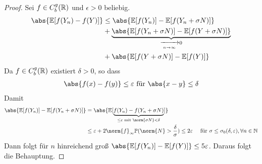 \begin{proof}
	Sei $f \in C_b^g(\mathbb{R})$ und $\epsilon > 0$ beliebig.
	\begin{align*}
		\abs{\E[f(Y_n)-f(Y)]} &\le \abs{\E[f(Y_n)] - \E[f(Y_n + \sigma N)]}\\
		&+ \underbrace{\abs{\E[f(Y_n + \sigma N)] - \E[f(Y+\sigma N)]}}_{\xrightarrow[n \to \infty]{}0}\\
		&+ \abs{\E[f(Y+\sigma N)] - \E[f(Y)]}
	\end{align*}
	Da $f \in C_b^g(\mathbb{R})$ existiert $\delta > 0$, so dass
	\begin{align*}
		\abs{f(x)-f(y)} \le \epsilon \text{ für } \abs{x-y} \le \delta
	\end{align*}
	Damit
	\begin{align*}
		\abs{\E[f(Y_n)] - \E[f(Y_n + \sigma N)]} &= \abs{\E[\underbrace{f(Y_n) - f(Y_n + \sigma N)}_{\le \epsilon \mit \norm{\sigma N}< \delta}]}\\
		&\le \epsilon + 2 \norm{f}_{\infty}\P(\norm{N} > \frac{\delta}{\sigma}) \le 2 \epsilon \quad \text{ für } \sigma \le \sigma_0(\delta, \epsilon), \forall n \in \N
	\end{align*}
	Dann folgt für $n$ hinreichend groß $\abs{\E[f(Y_n)] - \E[f(Y)]} \le 5 \epsilon$. Daraus folgt die Behauptung.
\end{proof}